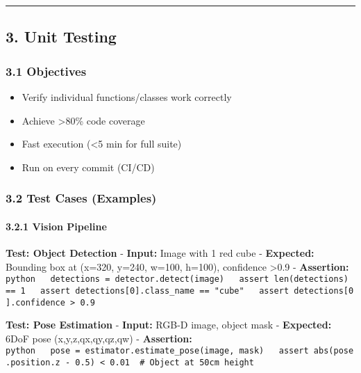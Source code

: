 \documentclass[
]{article}
\providecommand{\tightlist}{%
  \setlength{\itemsep}{0pt}\setlength{\parskip}{0pt}}
\begin{document}
\begin{center}\rule{0.5\linewidth}{0.5pt}\end{center}

\hypertarget{unit-testing}{%
\subsection{3. Unit Testing}\label{unit-testing}}

\hypertarget{objectives}{%
\subsubsection{3.1 Objectives}\label{objectives}}

\begin{itemize}
\tightlist
\item
  Verify individual functions/classes work correctly
\item
  Achieve \textgreater80\% code coverage
\item
  Fast execution (\textless5 min for full suite)
\item
  Run on every commit (CI/CD)
\end{itemize}

\hypertarget{test-cases-examples}{%
\subsubsection{3.2 Test Cases (Examples)}\label{test-cases-examples}}

\hypertarget{vision-pipeline}{%
\paragraph{3.2.1 Vision Pipeline}\label{vision-pipeline}}

\textbf{Test: Object Detection} - \textbf{Input:} Image with 1 red cube
- \textbf{Expected:} Bounding box at (x=320, y=240, w=100, h=100),
confidence \textgreater0.9 - \textbf{Assertion:}
\texttt{python\ \ \ detections\ =\ detector.detect(image)\ \ \ assert\ len(detections)\ ==\ 1\ \ \ assert\ detections{[}0{]}.class\_name\ ==\ "cube"\ \ \ assert\ detections{[}0{]}.confidence\ \textgreater{}\ 0.9}

\textbf{Test: Pose Estimation} - \textbf{Input:} RGB-D image, object
mask - \textbf{Expected:} 6DoF pose (x,y,z,qx,qy,qz,qw) -
\textbf{Assertion:}
\texttt{python\ \ \ pose\ =\ estimator.estimate\_pose(image,\ mask)\ \ \ assert\ abs(pose.position.z\ -\ 0.5)\ \textless{}\ 0.01\ \ \#\ Object\ at\ 50cm\ height}
\end{document}

